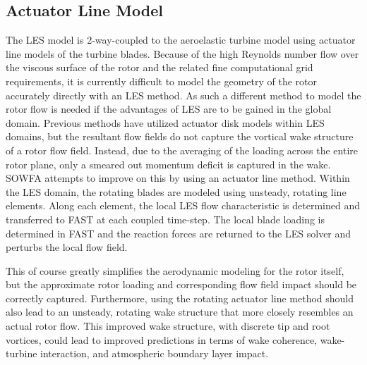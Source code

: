 \subsection{Actuator Line Model}\label{section5-2-2}
The LES model is 2-way-coupled to the aeroelastic turbine model using actuator line models of the turbine blades.\cite{shen2002} Because of the high Reynolds number flow over the viscous surface of the rotor and the related fine computational grid requirements, it is currently difficult to model the geometry of the rotor accurately directly with an LES method. As such a different method to model the rotor flow is needed if the advantages of LES are to be gained in the global domain. Previous methods have utilized actuator disk models within LES domains, but the resultant flow fields do not capture the vortical wake structure of a rotor flow field. Instead, due to the averaging of the loading across the entire rotor plane, only a smeared out momentum deficit is captured in the wake.\cite{mirocha2014} SOWFA attempts to improve on this by using an actuator line method. Within the LES domain, the rotating blades are modeled using unsteady, rotating line elements. Along each element, the local LES flow characteristic is determined and transferred to FAST at each coupled time-step. The local blade loading is determined in FAST and the reaction forces are returned to the LES solver and perturbs the local flow field.

This of course greatly simplifies the aerodynamic modeling for the rotor itself, but the approximate rotor loading and corresponding flow field impact should be correctly captured. Furthermore, using the rotating actuator line method should also lead to an unsteady, rotating wake structure that more closely resembles an actual rotor flow. This improved wake structure, with discrete tip and root vortices, could lead to improved predictions in terms of wake coherence, wake-turbine interaction, and atmospheric boundary layer impact.



